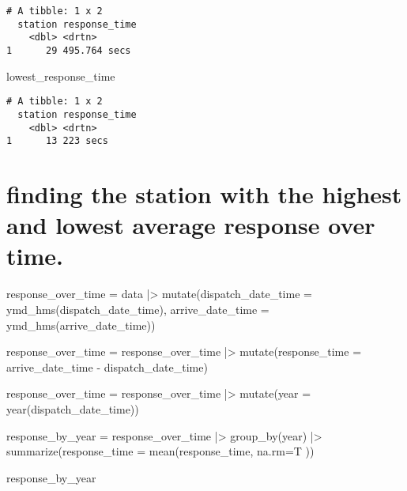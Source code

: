 \documentclass[
  letterpaper,
  DIV=11,
  numbers=noendperiod]{scrartcl}
\newenvironment{Shaded}{\begin{snugshade}}{\end{snugshade}}
\newcommand{\AttributeTok}[1]{\textcolor[rgb]{0.40,0.45,0.13}{#1}}
\newcommand{\FunctionTok}[1]{\textcolor[rgb]{0.28,0.35,0.67}{#1}}
\newcommand{\NormalTok}[1]{\textcolor[rgb]{0.00,0.23,0.31}{#1}}
\newcommand{\OtherTok}[1]{\textcolor[rgb]{0.00,0.23,0.31}{#1}}
\newcommand{\SpecialCharTok}[1]{\textcolor[rgb]{0.37,0.37,0.37}{#1}}
\begin{document}
\begin{verbatim}
# A tibble: 1 x 2
  station response_time
    <dbl> <drtn>       
1      29 495.764 secs 
\end{verbatim}

\begin{Shaded}
\begin{Highlighting}[]
\NormalTok{lowest\_response\_time}
\end{Highlighting}
\end{Shaded}

\begin{verbatim}
# A tibble: 1 x 2
  station response_time
    <dbl> <drtn>       
1      13 223 secs     
\end{verbatim}

\section{finding the station with the highest and lowest average
response over
time.}\label{finding-the-station-with-the-highest-and-lowest-average-response-over-time.}

\begin{Shaded}
\begin{Highlighting}[]
\NormalTok{response\_over\_time }\OtherTok{=}\NormalTok{ data }\SpecialCharTok{|\textgreater{}}
  \FunctionTok{mutate}\NormalTok{(}\AttributeTok{dispatch\_date\_time =} \FunctionTok{ymd\_hms}\NormalTok{(dispatch\_date\_time), }\AttributeTok{arrive\_date\_time =} \FunctionTok{ymd\_hms}\NormalTok{(arrive\_date\_time))}

\NormalTok{response\_over\_time }\OtherTok{=}\NormalTok{ response\_over\_time }\SpecialCharTok{|\textgreater{}}
  \FunctionTok{mutate}\NormalTok{(}\AttributeTok{response\_time =}\NormalTok{ arrive\_date\_time }\SpecialCharTok{{-}}\NormalTok{ dispatch\_date\_time)}

\NormalTok{response\_over\_time }\OtherTok{=}\NormalTok{ response\_over\_time }\SpecialCharTok{|\textgreater{}}
  \FunctionTok{mutate}\NormalTok{(}\AttributeTok{year =} \FunctionTok{year}\NormalTok{(dispatch\_date\_time))}

\NormalTok{response\_by\_year }\OtherTok{=}\NormalTok{ response\_over\_time }\SpecialCharTok{|\textgreater{}}
  \FunctionTok{group\_by}\NormalTok{(year) }\SpecialCharTok{|\textgreater{}}
  \FunctionTok{summarize}\NormalTok{(}\AttributeTok{response\_time =} \FunctionTok{mean}\NormalTok{(response\_time, }\AttributeTok{na.rm=}\NormalTok{T ))}

\NormalTok{response\_by\_year}
\end{Highlighting}
\end{Shaded}
\end{document}
